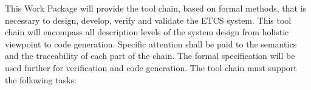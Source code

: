 \documentclass{template/openetcs_article}
\begin{document}
\newenvironment{inoutput}
{\vspace{2mm}
\noindent
\begin{tabular}{|r|p{.7\linewidth}|l|}
\hline}
{
\hline
\end{tabular}}



This Work Package will provide the tool chain, based on formal methods, that is necessary to
design, develop, verify and validate the ETCS system. This tool chain will encompass all description levels of the system design from holistic viewpoint to code generation. Specific attention shall be paid to the semantics and the traceability of each part of the chain. The formal specification will be used further for verification and code generation.
 The tool chain must support the following tasks:
\end{document}
